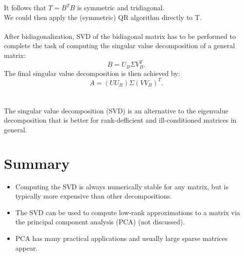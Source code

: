 \documentclass[11pt]{book}
\begin{document}
It follows that $T=B^{T} B$ is symmetric and tridiagonal.\\
We could then apply the (symmetric) QR algorithm directly to T.\\ \\
After bidiagonalization, SVD of the bidiagonal matrix has to be performed to complete the task of computing the singular value decomposition of a general matrix:
$$
B=U_B \Sigma V_B^T .
$$
The final singular value decomposition is then achieved by:
$$
A=\left(U U_B\right) \Sigma\left(V V_B\right)^T.
$$
\\ \\The singular value decomposition (SVD) is an alternative to the eigenvalue decomposition that is better for rank-defficient and ill-conditioned matrices in general.
\section*{Summary}
\begin{itemize}
  \item Computing the SVD is always numerically stable for any matrix, but is typically more expensive than other decompositions.

  \item The SVD can be used to compute low-rank approximations to a matrix via the principal component analysis (PCA) (not discussed).

  \item PCA has many practical applications and usually large sparse matrices appear.

\end{itemize}
\end{document}
